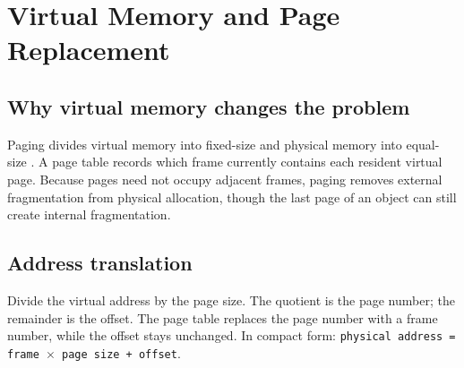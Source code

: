 \chapter{Virtual Memory and Page Replacement}\label{ch:vm}

\section{Why virtual memory changes the problem}
Paging divides virtual memory into fixed-size  and physical memory into equal-size . A page table records which frame currently contains each resident virtual page. Because pages need not occupy adjacent frames, paging removes external fragmentation from physical allocation, though the last page of an object can still create internal fragmentation.

\section{Address translation}
Divide the virtual address by the page size. The quotient is the page number;
the remainder is the offset. The page table replaces the page number with a
frame number, while the offset stays unchanged. In compact form:
\texttt{physical address = frame $\times$ page size + offset}.

